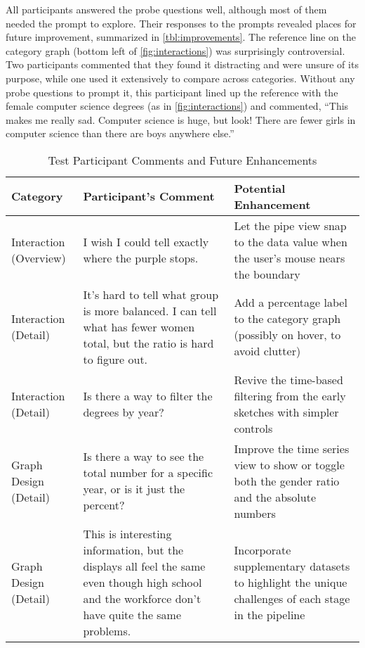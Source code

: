 All participants answered the probe questions well, although most of them needed the prompt to explore. Their responses to the prompts revealed places for future improvement, summarized in \autoref{tbl:improvements}. The reference line on the category graph (bottom left of \autoref{fig:interactions}) was surprisingly controversial. Two participants commented that they found it distracting and were unsure of its purpose, while one used it extensively to compare across categories. Without any probe questions to prompt it, this participant lined up the reference with the female computer science degrees (as in \autoref{fig:interactions}) and commented, ``This makes me really sad. Computer science is huge, but look! There are fewer girls in computer science than there are boys anywhere else.''

\begin{table}
  \centering

  \begin{tabular}{p{0.9in}p{2.3in}p{2.3in}}\hline
    \textbf{Category} & \textbf{Participant's Comment} & \textbf{Potential Enhancement} \\ \hline
    Interaction (Overview)
      & I wish I could tell exactly where the purple stops.
      & Let the pipe view snap to the data value when the user's mouse nears the boundary \\
    Interaction (Detail)
      & It's hard to tell what group is more balanced. I can tell what has fewer women total, but the ratio is hard to figure out.
      & Add a percentage label to the category graph (possibly on hover, to avoid clutter) \\
    Interaction (Detail)
      & Is there a way to filter the degrees by year?
      & Revive the time-based filtering from the early sketches with simpler controls \\
    Graph Design (Detail)
      & Is there a way to see the total number for a specific year, or is it just the percent?
      & Improve the time series view to show or toggle both the gender ratio and the absolute numbers \\
    Graph Design (Detail)
      & This is interesting information, but the displays all feel the same even though high school and the workforce don't have quite the same problems.
      & Incorporate supplementary datasets to highlight the unique challenges of each stage in the pipeline
  \end{tabular}

  \caption{Test Participant Comments and Future Enhancements}
  \label{tbl:improvements}
\end{table}

